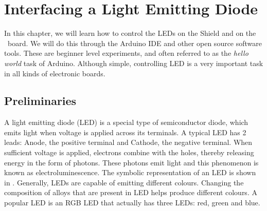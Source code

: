 \chapter {Interfacing a Light Emitting Diode}
\thispagestyle{empty}
\label{led}
\newcommand{\LocLEDfig}{\Origin/user-code/led/figures}
\newcommand{\LocLEDscicode}{\Origin/user-code/led/scilab}
\newcommand{\LocLEDscibrief}[1]{{\tt \seqsplit{%
        Origin/user-code/led/scilab/#1}}, see \fnrefp{fn:file-loc}}
\newcommand{\LocLEDardcode}{\Origin/user-code/led/arduino}
\newcommand{\LocLEDardbrief}[1]{{\tt \seqsplit{%
        Origin/user-code/led/arduino/#1}}, see \fnrefp{fn:file-loc}}

\newcommand{\LocLEDpycode}{\Origin/user-code/led/python}  %
\newcommand{\LocLEDpybrief}[1]{{\tt \seqsplit{%
        Origin/user-code/led/python/#1}}, see \fnrefp{fn:file-loc}} %


\newcommand{\LocLEDjuliacode}{\Origin/user-code/led/julia}  %
\newcommand{\LocLEDjuliabrief}[1]{{\tt \seqsplit{%
        Origin/user-code/led/julia/#1}}, see \fnrefp{fn:file-loc}} %

\newcommand{\LocLEDOpenModelicacode}{\Origin/user-code/led/OpenModelica}  %
\newcommand{\LocLEDOpenModelicabrief}[1]{{\tt \seqsplit{%
        Origin/user-code/led/OpenModelica/#1}}, see \fnrefp{fn:file-loc}} %


In this chapter, we will learn how to control the LEDs on the Shield
and on the \arduino\ board.  We will do this through the Arduino IDE and other open source software tools. 
These are beginner level experiments,
and often referred to as the \emph{hello world} task of Arduino.
Although simple, controlling LED is a very important task in all
kinds of electronic boards.

\section{Preliminaries}
\label{sec:led-pril}
A light emitting diode (LED) is a special type of semiconductor diode,
which emits light when voltage is applied across its terminals. A
typical LED has 2 leads: Anode, the positive terminal and Cathode, the
negative terminal.  When sufficient voltage is applied, electrons
combine with the holes, thereby releasing energy in the form of
photons.  These photons emit light and this phenomenon is known as
electroluminescence.  The symbolic representation of an LED is shown
in .  Generally, LEDs are capable of emitting
different colours.  Changing the composition of alloys that are
present in LED helps produce different colours.  A popular LED is an
RGB LED that actually has three LEDs: red, green and blue.

